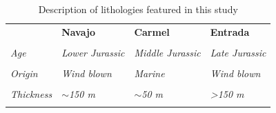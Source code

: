 \documentclass[12pt,a4paper]{article}
\begin{document}
	\afterpage %
    \clearpage %
    \thispagestyle{empty}%
    \begin{landscape}%

\begin{table}[]
\centering
\caption{Description of lithologies featured in this study \cite{aydin1977faulting}}
\begin{tabular}{llll}
                         & \textbf{Navajo}                                                                                                                                                          & \textbf{Carmel}                                                                                             & \textbf{Entrada}                                                                                                                       \\ \cline{2-4} 
&&&\\                         
\textit{Age}             & \textit{Lower Jurassic}                                                                                                                                                  & \textit{Middle Jurassic}                                                                                    & \textit{Late Jurassic}                                                                                                                 \\
&&&\\
\textit{Origin}          & \textit{Wind blown}                                                                                                                                                      & \textit{Marine}                                                                                             & \textit{Wind blown}                                                                                                                    \\
&&&\\
\textit{Thickness}       & \textit{$\sim$150 m}                                                                                                                                                     & \textit{$\sim$50 m}                                                                                         & \textit{\textgreater150 m}                                                                                                             \\
                         &                                                                                                                                                                          &                                                                                                             &                                                                                                                                        \\

\end{tabular}
\end{table}
\end{landscape}
\end{document}
